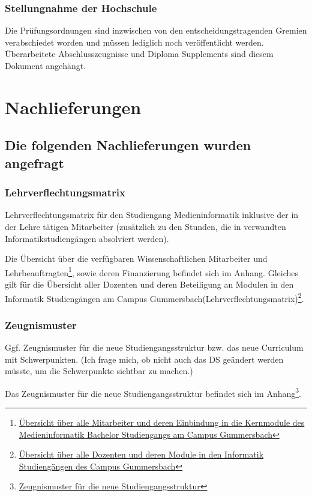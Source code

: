 \subsection{Stellungnahme der
Hochschule}\label{stellungnahme-der-hochschule-5}

Die Prüfungsordnungen sind inzwischen von den entscheidungstragenden
Gremien verabschiedet worden und müssen lediglich noch veröffentlicht
werden. Überarbeitete Abschlusszeugnisse und Diploma Supplements sind
diesem Dokument angehängt.

\chapter{Nachlieferungen}\label{nachlieferungen}

\section{Die folgenden Nachlieferungen wurden
angefragt}\label{die-folgenden-nachlieferungen-wurden-angefragt}

\subsection{Lehrverflechtungsmatrix}\label{lehrverflechtungsmatrix}

\begin{siderules}
Lehrverflechtungsmatrix für den Studiengang Medieninformatik inklusive
der in der Lehre tätigen Mitarbeiter (zusätzlich zu den Stunden, die in
verwandten Informatikstudiengängen absolviert werden).
\end{siderules}

Die Übersicht über die verfügbaren Wissenschaftlichen Mitarbeiter und
Lehrbeauftragten\footnote{\href{https://th-koeln.github.io/mi-2017/anhaenge/stellungsnahme/mitarbeiter-und-module-mi-kern-2017.pdf}{Übersicht
  über alle Mitarbeiter und deren Einbindung in die Kernmodule des
  Medieninformatik Bachelor Studiengangs am Campus Gummersbach}}, sowie
deren Finanzierung befindet sich im Anhang. Gleiches gilt für die
Übersicht aller Dozenten und deren Beteiligung an Modulen in den
Informatik Studiengängen am Campus
Gummersbach(Lehrverflechtungsmatrix)\footnote{\href{https://th-koeln.github.io/mi-2017/anhaenge/stellungsnahme/dozenten-und-module-2017.pdf}{Übersicht
  über alle Dozenten und deren Module in den Informatik Studiengängen
  des Campus Gummersbach}}.

\subsection{Zeugnismuster}\label{zeugnismuster}

\begin{siderules}
Ggf. Zeugnismuster für die neue Studiengangsstruktur bzw. das neue
Curriculum mit Schwerpunkten. (Ich frage mich, ob nicht auch das DS
geändert werden müsste, um die Schwerpunkte sichtbar zu machen.)
\end{siderules}

Das Zeugnismuster für die neue Studiengangsstruktur befindet sich im
Anhang\footnote{\href{https://th-koeln.github.io/mi-2017/anhaenge/stellungsnahme/Urkunde_Zeugnis_Entwurf_black.pdf}{Zeugnismuster
  für die neue Studiengangsstruktur}}.
